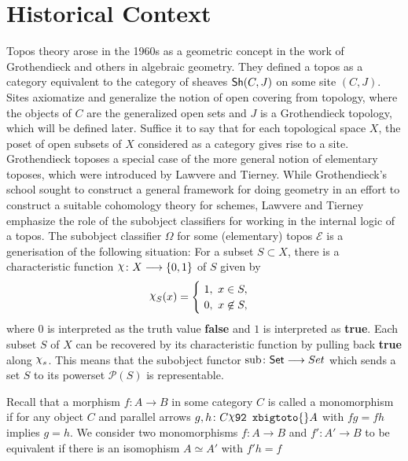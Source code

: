 \section{Historical Context}
Topos theory arose in the 1960s as a geometric concept in the work of Grothendieck and others in algebraic geometry. They defined a topos as a category equivalent to the category of sheaves $\operatorname{\mathsf{Sh}}(C,J)$ on some site $(C,J)$. Sites axiomatize and generalize the notion of open covering from topology, where the objects of $C$ are the generalized open sets and $J$ is a Grothendieck topology, which will be defined later. Suffice it to say that for each topological space $X$, the poset of open subsets of $X$ considered as a category gives rise to a site. Grothendieck toposes a special case of the more general notion of elementary toposes, which were introduced by Lawvere and Tierney. While Grothendieck's school sought to construct a general framework for doing geometry in an effort to construct a suitable cohomology theory for schemes, Lawvere and Tierney emphasize the role of the subobject classifiers for working in the internal logic of a topos. The subobject classifier $\Omega$ for some (elementary) topos $\mathcal{E}$ is a generisation of the following situation:
For a subset $S \subset X$, there is a characteristic function $\char \colon X \to \{0, 1\}$ of $S$ given by
\[ \char_S(x) =
	\begin{cases}
		\ 1,\ x \in S, \\
		\ 0,\ x \not \in S,
	\end{cases}
\]
where $0$ is interpreted as the truth value \textbf{false} and $1$ is interpreted as \textbf{true}. Each subset $S$ of $X$ can be recovered by its characteristic function by pulling back \textbf{true} along $\char_s$. This means that the subobject functor $\text{sub} \colon \mathsf{Set} \longrightarrow Set$ which sends a set $S$  to its powerset $\mathcal{P}(S)$ is representable.

\begin{construction}[Subobjects]
	Recall that a morphism $f \colon A \to B$ in some category $C$ is called a monomorphism if for any object $C$ and parallel arrows $g, h \colon C \xbigtoto{} A$ with $fg = fh$ implies $g = h$. We consider two monomorphisms $f \colon A \to B$ and $f' \colon A' \to B$ to be equivalent if there is an isomophism $A \simeq A'$ with $f'h = f$
\end{construction}


